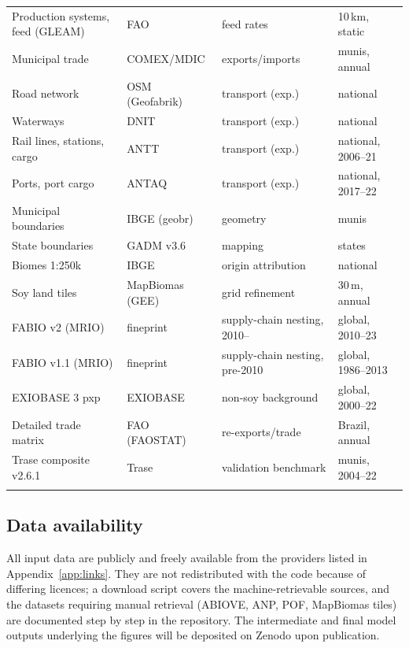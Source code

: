 \begin{table}[htbp]
\begin{tabular}{@{}p{3.5cm}p{2.3cm}p{3.0cm}p{2.6cm}@{}}
Production systems, feed (GLEAM)    & FAO                 & feed rates            & 10\,km, static \\
Municipal trade                    & COMEX/MDIC          & exports/imports       & munis, annual \\
Road network                       & OSM (Geofabrik)     & transport (exp.)      & national \\
Waterways                          & DNIT                & transport (exp.)      & national \\
Rail lines, stations, cargo        & ANTT                & transport (exp.)      & national, 2006--21 \\
Ports, port cargo                  & ANTAQ               & transport (exp.)      & national, 2017--22 \\
Municipal boundaries               & IBGE (geobr)        & geometry              & munis \\
State boundaries                   & GADM v3.6           & mapping               & states \\
Biomes 1:250k                      & IBGE                & origin attribution    & national \\
Soy land tiles                     & MapBiomas (GEE)     & grid refinement       & 30\,m, annual \\
FABIO v2 (MRIO)                    & fineprint           & supply-chain nesting, 2010-- & global, 2010--23 \\
FABIO v1.1 (MRIO)                  & fineprint           & supply-chain nesting, pre-2010 & global, 1986--2013 \\
EXIOBASE 3 pxp                     & EXIOBASE            & non-soy background    & global, 2000--22 \\
Detailed trade matrix              & FAO (FAOSTAT)       & re-exports/trade      & Brazil, annual \\
Trase composite v2.6.1             & Trase               & validation benchmark  & munis, 2004--22 \\
\botrule
\end{tabular}
\end{table}

\subsection{Data availability}\label{subsec:data-availability}
All input data are publicly and freely available from the providers listed
in Appendix~\ref{app:links}. They are not redistributed with the code
because of differing licences; a download script covers the
machine-retrievable sources, and the datasets requiring manual retrieval
(ABIOVE, ANP, POF, MapBiomas tiles) are documented step by step in the
repository. The intermediate and final model outputs underlying the figures
will be deposited on Zenodo upon publication.

